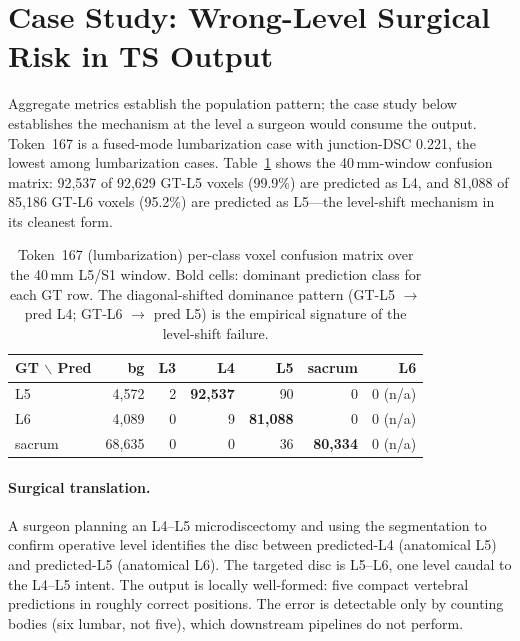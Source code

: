 \documentclass{article}
\newcommand{\sota}{TS}
\begin{document}
\section{Case Study: Wrong-Level Surgical Risk in \sota{}
Output}
\label{sec:case_study}

Aggregate metrics establish the population pattern; the
case study below establishes the mechanism at the level a
surgeon would consume the output. Token~167 is a fused-mode
lumbarization case with junction-DSC 0.221, the lowest
among lumbarization cases. Table~\ref{tab:case167} shows
the 40\,mm-window confusion matrix: 92{,}537 of 92{,}629
GT-L5 voxels (99.9\%) are predicted as L4, and 81{,}088 of
85{,}186 GT-L6 voxels (95.2\%) are predicted as L5---the
level-shift mechanism in its cleanest form.

\begin{table}[h]
\caption{Token~167 (lumbarization) per-class voxel
confusion matrix over the 40\,mm L5/S1 window. Bold cells:
dominant prediction class for each GT row. The
diagonal-shifted dominance pattern (GT-L5 $\to$ pred L4;
GT-L6 $\to$ pred L5) is the empirical signature of the
level-shift failure.}
\label{tab:case167}
\centering
\small
\begin{tabular}{lrrrrrr}
\toprule
\bfseries GT $\backslash$ Pred & \bfseries bg & \bfseries L3 & \bfseries L4 & \bfseries L5 & \bfseries sacrum & \bfseries L6 \\
\midrule
L5     & 4{,}572  & 2 & \textbf{92{,}537} & 90              & 0           & 0 (n/a) \\
L6     & 4{,}089  & 0 & 9                 & \textbf{81{,}088} & 0         & 0 (n/a) \\
sacrum & 68{,}635 & 0 & 0                 & 36              & \textbf{80{,}334} & 0 (n/a) \\
\bottomrule
\end{tabular}
\end{table}

\paragraph{Surgical translation.}
A surgeon planning an L4--L5 microdiscectomy and using the
segmentation to confirm operative level identifies the
disc between predicted-L4 (anatomical L5) and predicted-L5
(anatomical L6). The targeted disc is L5--L6, one level
caudal to the L4--L5 intent. The output is locally
well-formed: five compact vertebral predictions in roughly
correct positions. The error is detectable only by
counting bodies (six lumbar, not five), which downstream
pipelines do not perform.
\end{document}
